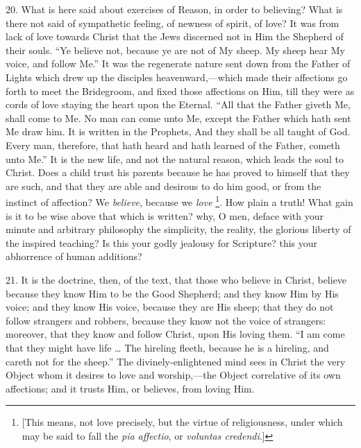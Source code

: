 20. What is here said about exercises of Reason, in order to
believing? What is there not said of sympathetic feeling, of newness
of spirit, of love? It was from lack of love towards Christ that the
Jews discerned not in Him the Shepherd of their souls. ``Ye
believe not, because ye are not of My sheep. My sheep hear My voice,
and follow Me.'' It was the regenerate nature sent down from the
Father of Lights which drew up the disciples heavenward,—which made
their affections go forth to meet the Bridegroom, and fixed those
affections on Him, till they were as cords of love staying the heart
upon the Eternal. ``All that the Father giveth Me, shall come to
Me. No man can come unto Me, except the Father which hath sent Me draw
him. It is written in the Prophets, And they shall be all taught of
God. Every man, therefore, that hath heard and hath learned of the
Father, cometh unto Me.'' It is the new life, and not the natural
reason, which leads the soul to Christ. Does a child trust his parents
because he has proved to himself that they are such, and that they are
able and desirous to do him good, or from the instinct of affection?
We \emph{believe}, because we \emph{love} \footnote{[This means,
not love precisely, but the virtue of religiousness, under which may
be said to fall the \emph{pia affectio}, or \emph{voluntas credendi}.]}. How plain a truth! What gain is it to be wise above that which
is written? why, O men, deface with your minute and arbitrary
philosophy the simplicity, the reality, the glorious liberty of the
inspired teaching? Is this your godly jealousy for Scripture? this
your abhorrence of human additions?

21. It is the doctrine, then, of the text, that those who believe
in Christ, believe because they know Him to be the Good Shepherd; and
they know Him by His voice; and they know His voice, because they are
His sheep; that they do not follow strangers and robbers, because they
know not the voice of strangers: moreover, that they know and follow
Christ, upon His loving them. ``I am come that they might have
life … The hireling fleeth, because he is a hireling, and careth not
for the sheep.'' The divinely-enlightened mind sees in Christ the
very Object whom it desires to love and worship,—the Object
correlative of its own affections; and it trusts Him, or believes,
from loving Him.

